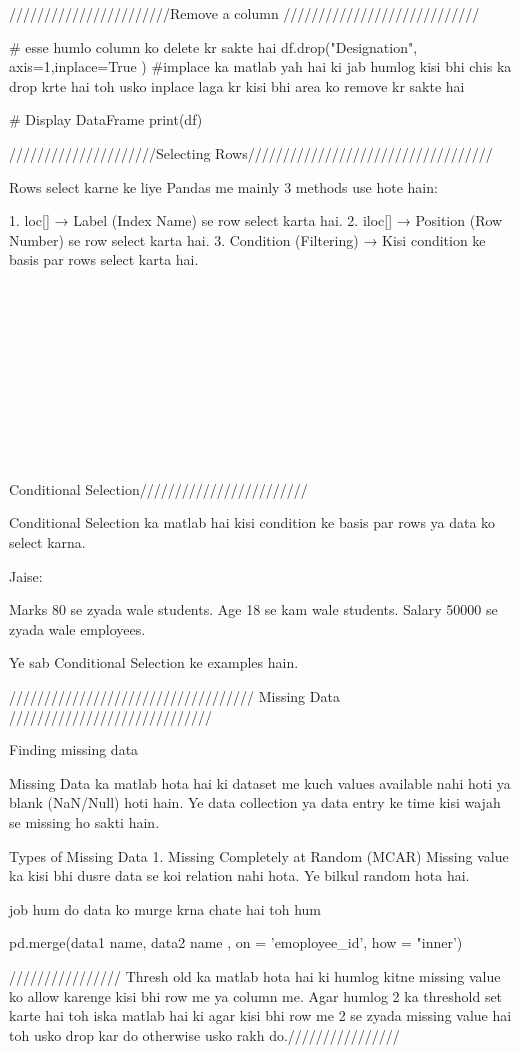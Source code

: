 ///////////////////////Remove a column ////////////////////////////

# esse humlo column ko delete kr sakte hai 
df.drop("Designation", axis=1,inplace=True ) #implace ka matlab yah hai ki jab humlog kisi bhi chis ka drop krte hai toh usko inplace laga kr kisi bhi area ko remove kr sakte hai 

# Display DataFrame
print(df)



/////////////////////Selecting Rows///////////////////////////////////

Rows select karne ke liye Pandas me mainly 3 methods use hote hain:

1. loc[] → Label (Index Name) se row select karta hai.
2. iloc[] → Position (Row Number) se row select karta hai.
3. Condition (Filtering) → Kisi condition ke basis par rows select karta hai.


\\\\\\\\\\\\\\\\\\\\ Conditional Selection////////////////////////

Conditional Selection ka matlab hai kisi condition ke basis par rows ya data ko select karna.

Jaise:

Marks 80 se zyada wale students.
Age 18 se kam wale students.
Salary 50000 se zyada wale employees.

Ye sab Conditional Selection ke examples hain.




///////////////////////////////////     Missing Data      /////////////////////////////

Finding missing data 

Missing Data ka matlab hota hai ki dataset me kuch values available nahi hoti ya blank (NaN/Null) hoti hain. Ye data collection ya data entry ke time kisi wajah se missing ho sakti hain.

Types of Missing Data
1. Missing Completely at Random (MCAR)
Missing value ka kisi bhi dusre data se koi relation nahi hota.
Ye bilkul random hota hai.



job hum do data ko murge krna chate hai toh hum 

pd.merge(data1 name, data2 name , on = 'emoployee_id', how = "inner')


//////////////// Thresh old ka matlab hota hai ki humlog kitne missing value ko allow karenge kisi bhi row me ya column me. Agar humlog 2 ka threshold set karte hai toh iska matlab hai ki agar kisi bhi row me 2 se zyada missing value hai toh usko drop kar do otherwise usko rakh do.////////////////



